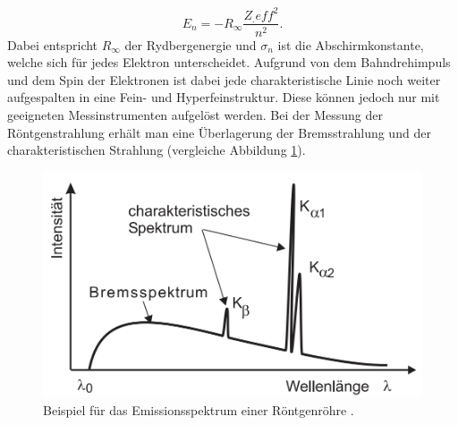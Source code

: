 \begin{equation}
E_n = -R_\infty\frac{Z_.{eff}^2}{n^2}\text{.}\label{eq:E_n}
\end{equation}  
Dabei entspricht $R_\infty$ der Rydbergenergie und $\sigma_n$ ist die Abschirmkonstante, welche sich für jedes Elektron unterscheidet. 
Aufgrund von dem Bahndrehimpuls und dem Spin der Elektronen ist dabei jede charakteristische Linie noch weiter aufgespalten in eine Fein- und Hyperfeinstruktur. Diese können jedoch nur mit geeigneten Messinstrumenten aufgelöst werden.
Bei der Messung der Röntgenstrahlung erhält man eine Überlagerung der Bremsstrahlung und der charakteristischen Strahlung (vergleiche Abbildung \ref{fig:Emission}).

\begin{figure}
\centering
\includegraphics[width=\linewidth-100pt,height=\textheight-100pt,keepaspectratio]{content/images/EmissionsSpektrum.png}
\caption{Beispiel für das Emissionsspektrum einer Röntgenröhre \cite{V602_Emissionsspektrum}.}
\label{fig:Emission}
\end{figure}


